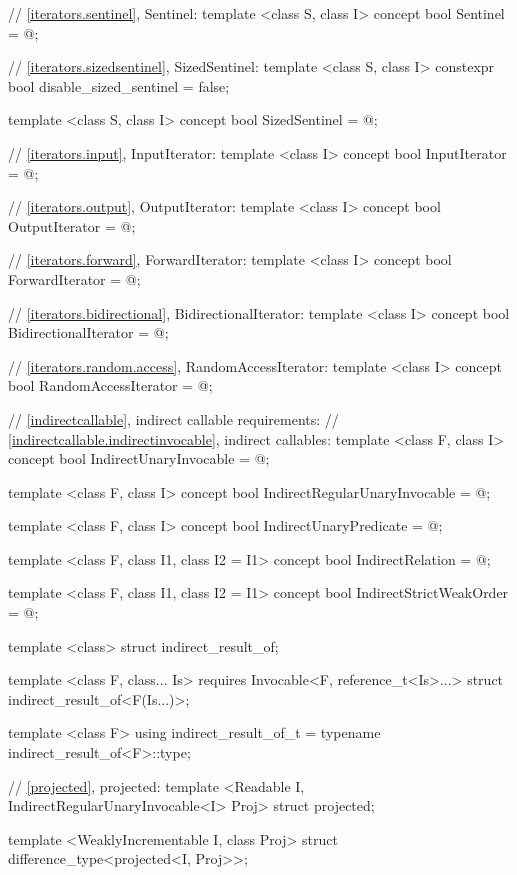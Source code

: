 \begin{codeblock}
{{{{  // \ref{iterators.sentinel}, Sentinel:
  template <class S, class I>
  concept bool Sentinel = @\seebelow@;

  // \ref{iterators.sizedsentinel}, SizedSentinel:
  template <class S, class I>
    constexpr bool disable_sized_sentinel = false;

  template <class S, class I>
  concept bool SizedSentinel = @\seebelow@;

  // \ref{iterators.input}, InputIterator:
  template <class I>
  concept bool InputIterator = @\seebelow@;

  // \ref{iterators.output}, OutputIterator:
  template <class I>
  concept bool OutputIterator = @\seebelow@;

  // \ref{iterators.forward}, ForwardIterator:
  template <class I>
  concept bool ForwardIterator = @\seebelow@;

  // \ref{iterators.bidirectional}, BidirectionalIterator:
  template <class I>
  concept bool BidirectionalIterator = @\seebelow@;

  // \ref{iterators.random.access}, RandomAccessIterator:
  template <class I>
  concept bool RandomAccessIterator = @\seebelow@;

  // \ref{indirectcallable}, indirect callable requirements:
  // \ref{indirectcallable.indirectinvocable}, indirect callables:
  template <class F, class I>
  concept bool IndirectUnaryInvocable = @\seebelow@;

  template <class F, class I>
  concept bool IndirectRegularUnaryInvocable = @\seebelow@;

  template <class F, class I>
  concept bool IndirectUnaryPredicate = @\seebelow@;

  template <class F, class I1, class I2 = I1>
  concept bool IndirectRelation = @\seebelow@;

  template <class F, class I1, class I2 = I1>
  concept bool IndirectStrictWeakOrder = @\seebelow@;

  template <class> struct indirect_result_of;

  template <class F, class... Is>
    requires Invocable<F, reference_t<Is>...>
  struct indirect_result_of<F(Is...)>;

  template <class F>
  using indirect_result_of_t
    = typename indirect_result_of<F>::type;

  // \ref{projected}, projected:
  template <Readable I, IndirectRegularUnaryInvocable<I> Proj>
  struct projected;

  template <WeaklyIncrementable I, class Proj>
  struct difference_type<projected<I, Proj>>;

}}}}
\end{codeblock}
